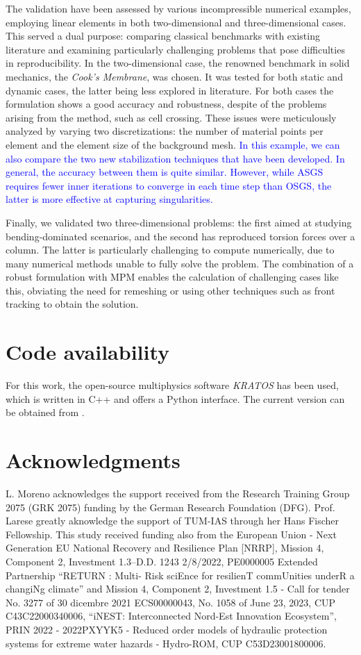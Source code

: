 \documentclass[11pt,english]{article}
\newcommand{\LM}[1]{\textcolor{blue}{#1}}
\begin{document}
The validation have been assessed by various incompressible numerical examples, employing linear elements in both two-dimensional and three-dimensional cases. This served a dual purpose: comparing classical benchmarks with existing literature and examining particularly challenging problems that pose difficulties in reproducibility. In the two-dimensional case, the renowned benchmark in solid mechanics, the \textit{Cook's Membrane}, was chosen. It was tested for both static and dynamic cases, the latter being less explored in literature.  For both cases the formulation shows a good accuracy and robustness, despite of the problems arising from the method, such as cell crossing. These issues were meticulously analyzed by varying two discretizations: the number of material points per element and the element size of the background mesh. \LM{In this example, we can also compare the two new stabilization techniques that have been developed. In general, the accuracy between them is quite similar. However, while ASGS requires fewer inner iterations to converge in each time step than OSGS, the latter is more effective at capturing singularities.}
 
Finally, we validated two three-dimensional problems: the first aimed at studying bending-dominated scenarios, and the second has reproduced torsion forces over a column. The latter is particularly challenging to compute numerically, due to many numerical methods unable to fully solve the problem. The combination of a robust formulation with MPM enables the calculation of challenging cases like this, obviating the need for remeshing or using other techniques such as front tracking to obtain the solution.


\section*{Code availability}
For this work, the open-source multiphysics software \textit{KRATOS}\cite{kratos1,kratos2,kratos3} has been used, which is written in C++ and offers a Python interface. The current version can be obtained from \cite{KratosGithub}.


\section*{Acknowledgments}
L. Moreno acknowledges the support received from the Research Training Group 2075 (GRK 2075) funding by the German Research Foundation (DFG). Prof. Larese greatly aknowledge the support of TUM-IAS through her Hans Fischer Fellowship.
This study received funding also from the European Union - Next Generation EU National Recovery and Resilience Plan [NRRP], Mission 4, Component 2, Investment 1.3–D.D. 1243 2/8/2022, PE0000005 Extended Partnership “RETURN : Multi- Risk sciEnce for resilienT commUnities underR a changiNg climate” and Mission 4, Component 2, Investment 1.5 - Call for tender No. 3277 of 30 dicembre 2021  ECS00000043, No. 1058 of June 23, 2023, CUP C43C22000340006, ``iNEST: Interconnected Nord-Est Innovation Ecosystem'', PRIN 2022 - 2022PXYYK5 - Reduced order models of hydraulic protection systems for extreme water hazards  - Hydro-ROM, CUP C53D23001800006.
\end{document}
